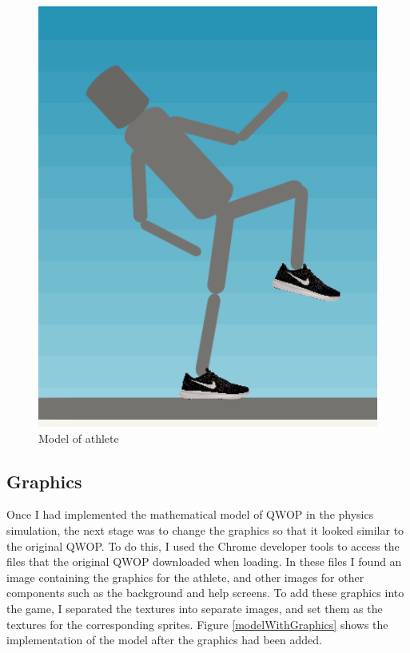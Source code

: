 \documentclass[12pt,a4paper,twoside,openright]{report}
\begin{document}





\begin{figure}[tbh]
\centerline{\includegraphics[scale=0.5]{athleteModel.PNG}}
\caption{Model of athlete}
\label{athleteModel}
\end{figure}

\subsection{Graphics}
\label{sec:graphics}

Once I had implemented the mathematical model of QWOP in the physics simulation, the next stage was to change the graphics so that it looked similar to the original QWOP.
To do this, I used the Chrome developer tools to access the files that the original QWOP downloaded when loading. In these files I found an image containing the graphics for the athlete, and other images for other components such as the background and help screens.
To add these graphics into the game, I separated the textures into separate images, and set them as the textures for the corresponding sprites.
Figure \ref{modelWithGraphics} shows the implementation of the model after the graphics had been added.
\end{document}
